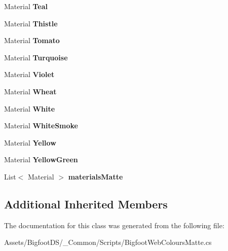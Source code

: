 \begin{DoxyCompactItemize}
Material {\bfseries Teal}
\item 
\mbox{\label{class_bigfoot_d_s_1_1_bigfoot_web_colours_matte_a09597dec61b49e2a2714c88d03c3c23d}} 
Material {\bfseries Thistle}
\item 
\mbox{\label{class_bigfoot_d_s_1_1_bigfoot_web_colours_matte_ae16d8af4de6495cd8e3e28f23b21c976}} 
Material {\bfseries Tomato}
\item 
\mbox{\label{class_bigfoot_d_s_1_1_bigfoot_web_colours_matte_a3423d04b235f3e4c54ebdbe96d596e07}} 
Material {\bfseries Turquoise}
\item 
\mbox{\label{class_bigfoot_d_s_1_1_bigfoot_web_colours_matte_acc51d8b77d2b2588790d74f5505d8580}} 
Material {\bfseries Violet}
\item 
\mbox{\label{class_bigfoot_d_s_1_1_bigfoot_web_colours_matte_a8f825fa467a990ea3ec3bebc2998c91b}} 
Material {\bfseries Wheat}
\item 
\mbox{\label{class_bigfoot_d_s_1_1_bigfoot_web_colours_matte_a3c86726cb4fd8f4b314058d5db5c5ae8}} 
Material {\bfseries White}
\item 
\mbox{\label{class_bigfoot_d_s_1_1_bigfoot_web_colours_matte_a43d540fe222ba06bcc58f0d40bb71125}} 
Material {\bfseries White\+Smoke}
\item 
\mbox{\label{class_bigfoot_d_s_1_1_bigfoot_web_colours_matte_a1552a72f547e626f83d5b3c967f96512}} 
Material {\bfseries Yellow}
\item 
\mbox{\label{class_bigfoot_d_s_1_1_bigfoot_web_colours_matte_a5b7837231fca86af557ceb63473b7103}} 
Material {\bfseries Yellow\+Green}
\item 
\mbox{\label{class_bigfoot_d_s_1_1_bigfoot_web_colours_matte_af54f35ef94926411c7fa8469ec8ce664}} 
List$<$ Material $>$ {\bfseries materials\+Matte}
\end{DoxyCompactItemize}
\subsection*{Additional Inherited Members}


The documentation for this class was generated from the following file\+:\begin{DoxyCompactItemize}
\item 
Assets/\+Bigfoot\+D\+S/\+\_\+\+Common/\+Scripts/Bigfoot\+Web\+Colours\+Matte.\+cs\end{DoxyCompactItemize}
